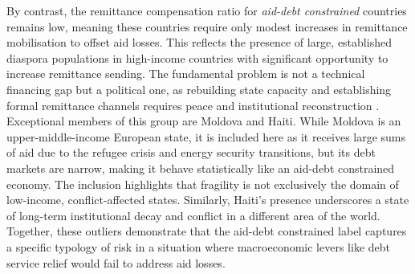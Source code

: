 \documentclass[fleqn,10pt,twocolumn]{wlscirep}
\begin{document}
{{By contrast, the remittance compensation ratio for \textit{aid-debt constrained} countries remains low, meaning these countries require only modest increases in remittance mobilisation to offset aid losses. This reflects the presence of large, established diaspora populations in high-income countries with significant opportunity to increase remittance sending. The fundamental problem is not a technical financing gap but a political one, as rebuilding state capacity and establishing formal remittance channels requires peace and institutional reconstruction \cite{carment2018diasporas}. Exceptional members of this group are Moldova and Haiti. While Moldova is an upper-middle-income European state, it is included here as it receives large sums of aid due to the refugee crisis and energy security transitions, but its debt markets are narrow, making it behave statistically like an aid-debt constrained economy. The inclusion highlights that fragility is not exclusively the domain of low-income, conflict-affected states. Similarly, Haiti’s presence underscores a state of long-term institutional decay and conflict in a different area of the world. Together, these outliers demonstrate that the aid-debt constrained label captures a specific typology of risk in a situation where macroeconomic levers like debt service relief would fail to address aid losses.
}

}
\end{document}
